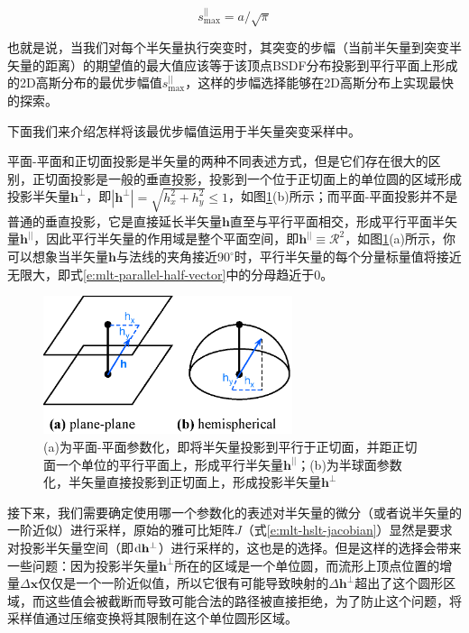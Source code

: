 \begin{equation}
	s^{||}_{\max}=a/\sqrt{\pi}
\end{equation}

也就是说，当我们对每个半矢量执行突变时，其突变的步幅（当前半矢量到突变半矢量的距离）的期望值的最大值应该等于该顶点BSDF分布投影到平行平面上形成的2D高斯分布的最优步幅值$s^{||}_{\max}$，这样的步幅选择能够在2D高斯分布上实现最快的探索。

下面我们来介绍怎样将该最优步幅值运用于半矢量突变采样中。

平面-平面和正切面投影是半矢量的两种不同表述方式，但是它们存在很大的区别，正切面投影是一般的垂直投影，投影到一个位于正切面上的单位圆的区域形成投影半矢量$\mathbf{h}^{\perp}$，即$|\mathbf{h}^{\perp}|=\sqrt{h^{2}_x+h^{2}_y} \leq 1$，如图\ref{f:mlt-plane-plane}(b)所示；而平面-平面投影并不是普通的垂直投影，它是直接延长半矢量$\mathbf{h}$直至与平行平面相交，形成平行平面半矢量$\mathbf{h}^{||}$，因此平行半矢量的作用域是整个平面空间，即$\mathbf{h}^{||}\equiv\mathcal{R}^{2}$，如图\ref{f:mlt-plane-plane}(a)所示，你可以想象当半矢量$\mathbf{h}$与法线的夹角接近$90^{\circ}$时，平行半矢量的每个分量标量值将接近无限大，即式\ref{e:mlt-parallel-half-vector}中的分母趋近于0。

\begin{figure}
	\sidecaption
	\includegraphics[width=0.65\textwidth]{figures/mlt/plane-plane}
	\caption{(a)为平面-平面参数化，即将半矢量投影到平行于正切面，并距正切面一个单位的平行平面上，形成平行半矢量$\mathbf{h}^{||}$；(b)为半球面参数化，半矢量直接投影到正切面上，形成投影半矢量$\mathbf{h}^{\perp}$}
	\label{f:mlt-plane-plane}
\end{figure}

接下来，我们需要确定使用哪一个参数化的表述对半矢量的微分（或者说半矢量的一阶近似）进行采样，原始的雅可比矩阵$J$（式\ref{e:mlt-hslt-jacobian}）显然是要求对投影半矢量空间（即${\rm d}\mathbf{h}^{\perp}$）进行采样的，这也是\cite{a:TheNaturalConstraintRepresentationofthePathSpaceforEfficientLightTransportSimulation}的选择。但是这样的选择会带来一些问题：因为投影半矢量$\mathbf{h}^{\perp}$所在的区域是一个单位圆，而流形上顶点位置的增量$\Delta\mathbf{x}$仅仅是一个一阶近似值，所以它很有可能导致映射的$\Delta\mathbf{h}^{\perp}$超出了这个圆形区域，而这些值会被截断而导致可能合法的路径被直接拒绝，为了防止这个问题，\cite{a:TheNaturalConstraintRepresentationofthePathSpaceforEfficientLightTransportSimulation}将采样值通过压缩变换将其限制在这个单位圆形区域。

